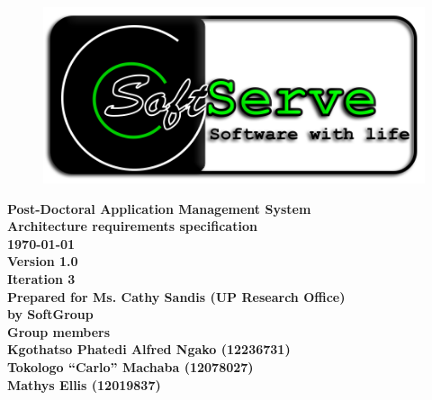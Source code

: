 \documentclass[12pt]{article}
\newcommand{\Title}{Architecture requirements specification} %
\newcommand{\ssr}{Soft\color{green}{Serve }\color{black}}
\newcommand{\version}{1.0}
\newcommand{\iteration}{3}
\newcommand{\client}{Ms. Cathy Sandis (UP Research Office)}
\newcommand{\project}{Post-Doctoral Application Management System}
\begin{document}
\vspace{4em}

\begin{center}%

\begin{figure}[ht!]
\centering
\includegraphics{../Images_Docs/logo.png}
\end{figure}
\LARGE \bf \project \\[1em]
\LARGE \bf \Title \\[0.25em]
\large \bf \today\\
\bf Version \version\\
\bf Iteration \iteration\\[0.5em]
\Large \bf Prepared for \client\\
\Large \bf by
\Large {\bf \ssr Group }\\[0.5em]
\LARGE {\bf Group members}\\[0.25em]
\large
Kgothatso Phatedi Alfred Ngako (12236731) \\[0.5em]
Tokologo “Carlo” Machaba (12078027) \\[0.5em]
Mathys Ellis (12019837) \\[8em]

\end{center}%

\end{document}
